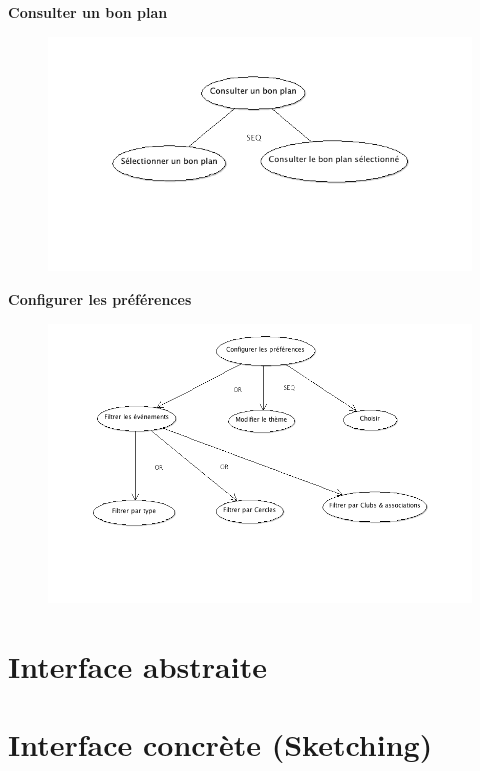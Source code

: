 \documentclass[a4paper, 11pt]{article}
\begin{document}
\textbf{Consulter un bon plan}

\begin{figure}[h!]
\includegraphics[width=18cm]{consulter_bonplans.png}
\end{figure}
\vfill
\clearpage

\textbf{Configurer les préférences}
\begin{figure}[h]
\centering
\includegraphics[width = \textwidth]{configurer_preferences.png}
\end{figure}

\vfill
\clearpage
\section{Interface abstraite}
\label{abstr}
\newpage

\section{Interface concrète (Sketching)}
\label{concrete}
\end{document}
